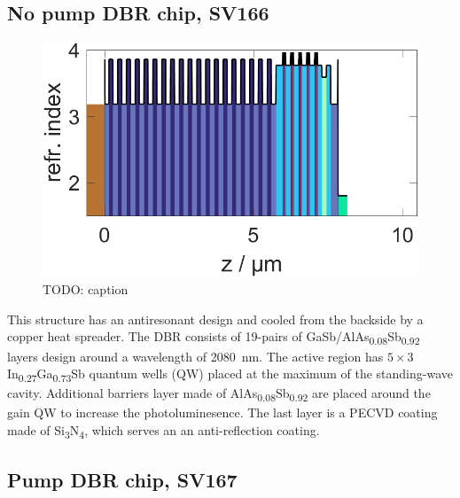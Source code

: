 

\subsection*{No pump DBR chip, SV166}

\begin{figure}
    \vspace{-\baselineskip}
    \centering
    \includegraphics[width=.98\textwidth]{images/1SV166.lay.png}
    \caption{TODO: caption}
    \label{fig:sv166}
\end{figure}

This structure has an antiresonant design and cooled from the backside by a copper heat spreader. The DBR consists of 19-pairs of GaSb/AlAs\textsubscript{0.08}Sb\textsubscript{0.92} layers design around a wavelength of \qty{2080}{nm}. The active region has $5\times3$ In\textsubscript{0.27}Ga\textsubscript{0.73}Sb quantum wells (QW) placed at the maximum of the standing-wave cavity. Additional barriers layer made of AlAs\textsubscript{0.08}Sb\textsubscript{0.92} are placed around the gain QW to increase the photoluminesence. The last layer is a PECVD coating made of Si\textsubscript{3}N\textsubscript{4}, which serves an an anti-reflection coating.


\subsection*{Pump DBR chip, SV167}

